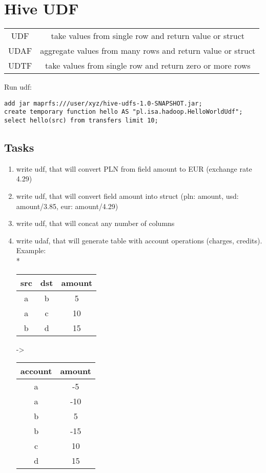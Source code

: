 \documentclass{article}
\begin{document}
\section*{Hive UDF}

\begin{tabular}{c | c }
	UDF & take values from single row and return value or struct \\
	UDAF & aggregate values from many rows and return value or struct \\
	UDTF & take values from single row and return zero or more rows \\
\end{tabular}

\bigskip


Run udf:
\begin{lstlisting}
add jar maprfs:///user/xyz/hive-udfs-1.0-SNAPSHOT.jar;
create temporary function hello AS "pl.isa.hadoop.HelloWorldUdf";
select hello(src) from transfers limit 10;
\end{lstlisting}

\subsection*{Tasks}

\begin{enumerate}
\item write udf, that will convert PLN from field amount to EUR (exchange rate 4.29)
\item write udf, that will convert field amount into struct (pln: amount, usd: amount/3.85, eur: amount/4.29)
\item write udf, that will concat any number of columns
\item write udaf, that will generate table with account operations (charges, credits). Example: 
\\*
\begin{tabular}{c | c | c }
	src & dst & amount \\ \hline 
	a & b & 5 \\
	a & c & 10 \\
	b & d & 15 \\
\end{tabular}
->
\begin{tabular}{c | c}
	account & amount \\ \hline 
	a & -5 \\
	a & -10 \\
	b & 5 \\
	b & -15 \\
	c & 10 \\
	d & 15 \\
\end{tabular}
\end{enumerate}
\end{document}

